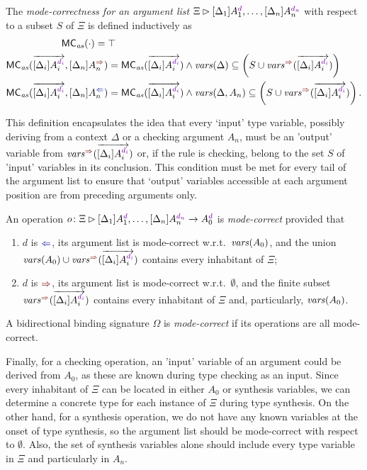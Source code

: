 \begin{definition}\label{def:mode-correctness}
  The \emph{mode-correctness for an argument list} $\Xi \rhd [\Delta_{1}] A_{1}^{\dir{d}}, \ldots, [\Delta_n]A_{n}^{\dir{d_n}}$  with respect to a subset $S$ of $\Xi$ is defined inductively as
  \begin{align*}
    \MC_{\mathit{as}}( \cdot ) ={} & \top \\
    \MC_{\mathit{as}}(\overrightarrow{[\Delta_i]A_i^{\dir{d_i}}}, [\Delta_{n}]A_{n}^{\syn}) 
    & = \MC_{\mathit{as}}(\overrightarrow{[\Delta_i]A_i^{\dir{d_i}}})
    \land \fv(\Delta) \subseteq \left( S \cup \synvar(\overrightarrow{[\Delta_i]A_i^{\dir{d_i}}}) \right)\\
    \MC_{\mathit{as}}(\overrightarrow{[\Delta_i]A_i^{\dir{d_i}}}, [\Delta_{n}]A_{n}^{\chk})
    & = \MC_{\mathit{as}}(\overrightarrow{[\Delta_i]A_i^{\dir{d_i}}})
    \land \fv(\Delta, A_n) \subseteq \left( S \cup \synvar(\overrightarrow{[\Delta_i]A_i^{\dir{d_i}}})\right).
  \end{align*}
\end{definition}
This definition encapsulates the idea that every `input' type variable, possibly deriving from a context $\Delta$ or a checking argument $A_n$, must be an 'output' variable from $\synvar(\overrightarrow{[\Delta_i]A_i^{\dir{d_i}}})$ or, if the rule is checking, belong to the set $S$ of 'input' variables in its conclusion.
This condition must be met for every tail of the argument list to ensure that `output' variables accessible at each argument position are from preceding arguments only.
\begin{definition}
  An operation $o\colon \Xi \rhd [\Delta_{1}] A_{1}^{\dir{d}}, \ldots, [\Delta_n]A_{n}^{\dir{d_n}} \to A_0^{\dir{d}}$ is \emph{mode-correct} provided that
  \begin{enumerate}
    \item $d$ is $\chk$, its argument list is mode-correct w.r.t.\ $\mathit{vars}(A_0)$, and the union $\fv(A_0) \cup \synvar(\overrightarrow{[\Delta_i]A_i^{\dir{d_i}}})$ contains every inhabitant of $\Xi$;
    \item $d$ is $\syn$, its argument list is mode-correct w.r.t.\ $\emptyset$, and the finite subset $\synvar(\overrightarrow{[\Delta_i]A_i^{\dir{d_i}}})$ contains every inhabitant of $\Xi$ and, particularly, $\mathit{vars}(A_0)$.
  \end{enumerate}
  A bidirectional binding signature $\Omega$ is \emph{mode-correct} if its operations are all mode-correct.
\end{definition}
Finally, for a checking operation, an 'input' variable of an argument could be derived from $A_0$, as these are known during type checking as an input.
Since every inhabitant of $\Xi$ can be located in either $A_0$ or synthesis variables, we can determine a concrete type for each instance of $\Xi$ during type synthesis.
On the other hand, for a synthesis operation, we do not have any known variables at the onset of type synthesis, so the argument list should be mode-correct with respect to $\emptyset$.
Also, the set of synthesis variables alone should include every type variable in $\Xi$ and particularly in $A_n$.

